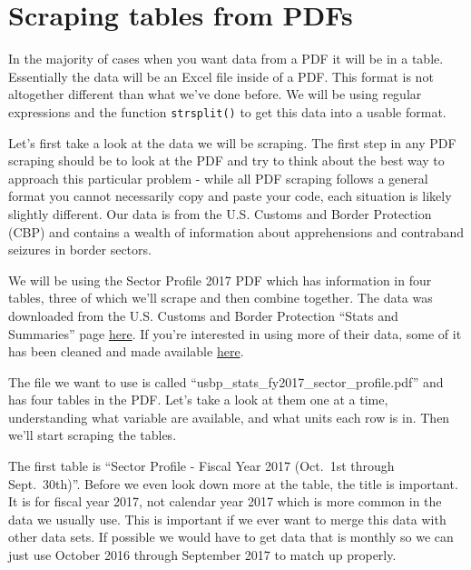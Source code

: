 \documentclass[
  12pt,
]{book}
\begin{document}
\hypertarget{scrape-table}{%
\chapter{Scraping tables from PDFs}\label{scrape-table}}

In the majority of cases when you want data from a PDF it will be in a table. Essentially the data will be an Excel file inside of a PDF. This format is not altogether different than what we've done before. We will be using regular expressions and the function \texttt{strsplit()} to get this data into a usable format.

Let's first take a look at the data we will be scraping. The first step in any PDF scraping should be to look at the PDF and try to think about the best way to approach this particular problem - while all PDF scraping follows a general format you cannot necessarily copy and paste your code, each situation is likely slightly different. Our data is from the U.S. Customs and Border Protection (CBP) and contains a wealth of information about apprehensions and contraband seizures in border sectors.

We will be using the Sector Profile 2017 PDF which has information in four tables, three of which we'll scrape and then combine together. The data was downloaded from the U.S. Customs and Border Protection ``Stats and Summaries'' page \href{https://www.cbp.gov/newsroom/media-resources/stats}{here}. If you're interested in using more of their data, some of it has been cleaned and made available \href{https://www.openicpsr.org/openicpsr/project/109522/version/V2/view}{here}.

The file we want to use is called ``usbp\_stats\_fy2017\_sector\_profile.pdf'' and has four tables in the PDF. Let's take a look at them one at a time, understanding what variable are available, and what units each row is in. Then we'll start scraping the tables.

The first table is ``Sector Profile - Fiscal Year 2017 (Oct.~1st through Sept.~30th)''. Before we even look down more at the table, the title is important. It is for fiscal year 2017, not calendar year 2017 which is more common in the data we usually use. This is important if we ever want to merge this data with other data sets. If possible we would have to get data that is monthly so we can just use October 2016 through September 2017 to match up properly.
\end{document}
